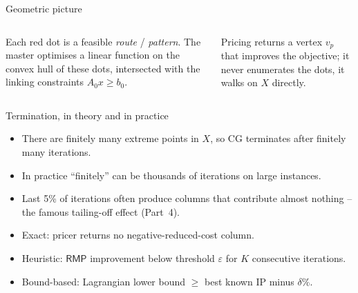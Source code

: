 \documentclass[10pt,aspectratio=169]{beamer}
\newcommand{\rmp}{\mathsf{RMP}}
\begin{document}
\begin{frame}{Geometric picture}
  \begin{columns}[T,onlytextwidth]
    \small
    Each red dot is a feasible \emph{route} / \emph{pattern}. The master
    optimises a linear function on the convex hull of these dots, intersected
    with the linking constraints $A_0 x\ge b_0$.

    \medskip
    Pricing returns a vertex $v_p$ that improves the objective; it never
    enumerates the dots, it \alert{walks} on $X$ directly.
  \end{columns}
\end{frame}

\begin{frame}{Termination, in theory and in practice}
  \begin{itemize}\small
    \item There are finitely many extreme points in $X$, so CG terminates
          after finitely many iterations.
    \item In practice ``finitely'' can be \alert{thousands} of iterations on
          large instances.
    \item Last 5\% of iterations often produce columns that contribute almost
          nothing -- the famous \alert{tailing-off} effect (Part~4).
  \end{itemize}
  \vfill
  \begin{keybox}
    \begin{itemize}\small
      \item Exact: pricer returns no negative-reduced-cost column.
      \item Heuristic: $\rmp$ improvement below threshold $\varepsilon$ for
            $K$ consecutive iterations.
      \item Bound-based: Lagrangian lower bound $\ge$ best known IP minus
            $\delta\%$.
    \end{itemize}
  \end{keybox}
\end{frame}
\end{document}
